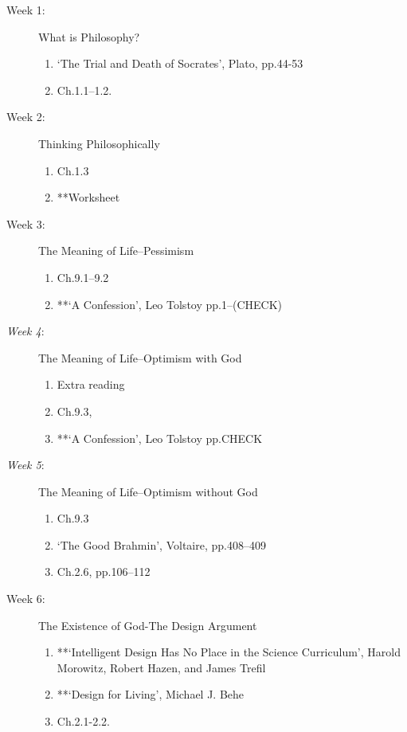 \documentclass[article,oneside]{memoir}
\begin{document}
\begin{description}

\item[Week 1:] What is Philosophy?
\begin{enumerate}
\item `The Trial and Death of Socrates', Plato, pp.44-53
\item Ch.1.1--1.2.
\end{enumerate}

\item[Week 2:]  Thinking Philosophically
\begin{enumerate}
\item Ch.1.3
\item **Worksheet
\end{enumerate}

\item[Week 3:]  The Meaning of Life--Pessimism
\begin{enumerate}
\item Ch.9.1--9.2 
\item **`A Confession', Leo Tolstoy pp.1--(CHECK)
\end{enumerate}

\item[\textit{Week 4}: ] The Meaning of Life--Optimism with God
\begin{enumerate}
\item Extra reading
\item Ch.9.3,
\item **`A Confession', Leo Tolstoy pp.CHECK
\end{enumerate}

\item[\textit{Week 5}: ] The Meaning of Life--Optimism without God
\begin{enumerate}
\item Ch.9.3
\item `The Good Brahmin', Voltaire, pp.408--409
\item Ch.2.6, pp.106--112
\end{enumerate}


\item[Week 6: ] The Existence of God-The Design Argument
\begin{enumerate}
\item **`Intelligent Design Has No Place in the Science Curriculum', Harold Morowitz, Robert Hazen, and James Trefil
 \item **`Design for Living', Michael J. Behe
\item Ch.2.1-2.2. 
 \end{enumerate}
 

\end{description}
\end{document}
